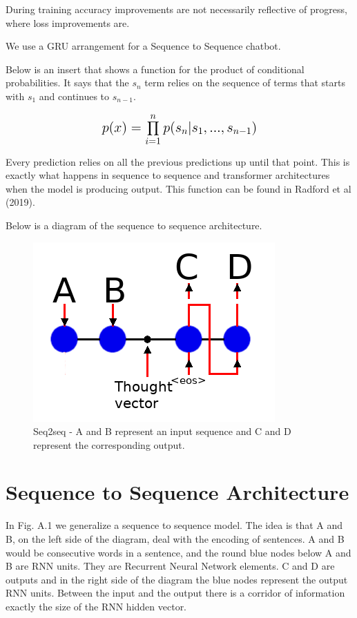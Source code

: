 During training accuracy improvements are not necessarily reflective of progress, where loss
improvements are.

We use a GRU arrangement for a Sequence to Sequence chatbot.

Below is an insert that shows a function for the product of conditional probabilities. It says that the $s_n$ term relies on the sequence of terms that starts with $s_1$ and continues to $s_{n-1}$.

\[
\mathlarger{ \mathlarger{p(x) = \prod_{i=1}^{n} p(s_n|s_1,..., s_{n-1}) } }
\]

Every prediction relies on all the previous predictions up until that point. This is exactly what happens in sequence to sequence and transformer architectures when the model is producing output. This function can be found in Radford et al (2019)\cite{radford2019language}.

Below is a diagram of the sequence to sequence architecture.

\begin{figure}[H]

\begin{center}

\includegraphics[scale=0.5]{diagram-nmt}

	
\end{center}

\caption[Sequence to Sequence]{Seq2seq - A and B represent an input sequence and C and D represent the corresponding output.}

\end{figure}


\section{Sequence to Sequence Architecture}

In Fig. A.1 we generalize a sequence to sequence model. The idea is
that A and B, on the left side of the diagram, deal with the encoding
of sentences. A and B would be consecutive words in a sentence, and
the round blue nodes below A and B are RNN units. They are Recurrent
Neural Network elements. C and D are outputs and in the right side
of the diagram the blue nodes represent the output RNN units. Between
the input and the output there is a corridor of information exactly
the size of the RNN hidden vector. 

